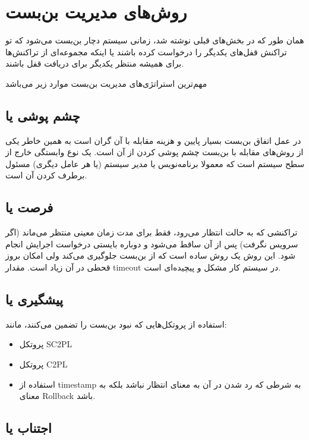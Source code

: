 \section{روش‌های مدیریت بن‌بست}

همان طور که در بخش‌های قبلی نوشته شد، زمانی سیستم دچار بن‌بست می‌شود که تو
تراکنش قفل‌های یکدیگر را درخواست کرده باشند یا اینکه مجموعه‌ای از تراکنش‌ها برای
همیشه منتظر یکدیگر برای دریافت قفل باشند.

مهم‌ترین استراتژی‌های مدیریت بن‌بست موارد زیر می‌باشد

\subsection{چشم پوشی یا }

در عمل اتفاق بن‌بست بسیار پایین و هزینه مقابله با آن گران است به همین خاطر یکی
از روش‌های مقابله با بن‌بست چشم پوشی کردن از آن است.  یک نوع وابستگی خارج از سطح
سیستم است که معمولا برنامه‌نویس یا مدیر سیستم (یا هر عامل دیگری) مسئول برطرف
کردن آن است.

\subsection{فرصت یا }

تراکنشی که به حالت انتظار می‌رود، فقط برای مدت زمان معینی منتظر می‌ماند (اگر
سرویس نگرفت) پس از آن ساقط می‌شود و دوباره بایستی درخواست اجرایش انجام شود. این
روش یک روش ساده است که از بن‌بست جلوگیری می‌کند ولی امکان بروز قحطی در آن زیاد
است. مقدار timeout در سیستم کار مشکل و پیچیده‌ای است.

\subsection{پیشگیری یا }

استفاده از پروتکل‌هایی که نبود بن‌بست را تضمین می‌کنند، مانند:

\begin{itemize}
    \item پروتکل SC2PL
    \item پروتکل C2PL
    \item استفاده از timestamp به شرطی که رد شدن در آن به معنای انتظار نباشد
    بلکه به معنای Rollback باشد.
\end{itemize}

\subsection{اجتناب یا }

